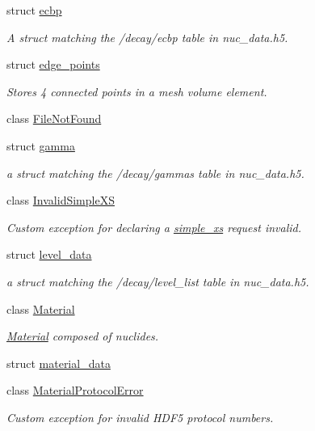 \begin{DoxyCompactItemize}
struct \hyperlink{structpyne_1_1ecbp}{ecbp}
\begin{DoxyCompactList}\small\item\em A struct matching the \textquotesingle{}/decay/ecbp\textquotesingle{} table in nuc\+\_\+data.\+h5. \end{DoxyCompactList}\item 
struct \hyperlink{structpyne_1_1edge__points}{edge\+\_\+points}
\begin{DoxyCompactList}\small\item\em Stores 4 connected points in a mesh volume element. \end{DoxyCompactList}\item 
class \hyperlink{classpyne_1_1_file_not_found}{File\+Not\+Found}
\item 
struct \hyperlink{structpyne_1_1gamma}{gamma}
\begin{DoxyCompactList}\small\item\em a struct matching the \textquotesingle{}/decay/gammas\textquotesingle{} table in nuc\+\_\+data.\+h5. \end{DoxyCompactList}\item 
class \hyperlink{classpyne_1_1_invalid_simple_x_s}{Invalid\+Simple\+XS}
\begin{DoxyCompactList}\small\item\em Custom exception for declaring a \hyperlink{structsimple__xs}{simple\+\_\+xs} request invalid. \end{DoxyCompactList}\item 
struct \hyperlink{structpyne_1_1level__data}{level\+\_\+data}
\begin{DoxyCompactList}\small\item\em a struct matching the \textquotesingle{}/decay/level\+\_\+list\textquotesingle{} table in nuc\+\_\+data.\+h5. \end{DoxyCompactList}\item 
class \hyperlink{classpyne_1_1_material}{Material}
\begin{DoxyCompactList}\small\item\em \hyperlink{classpyne_1_1_material}{Material} composed of nuclides. \end{DoxyCompactList}\item 
struct \hyperlink{structpyne_1_1material__data}{material\+\_\+data}
\item 
class \hyperlink{classpyne_1_1_material_protocol_error}{Material\+Protocol\+Error}
\begin{DoxyCompactList}\small\item\em Custom exception for invalid H\+D\+F5 protocol numbers. \end{DoxyCompactList}\item 

\end{DoxyCompactItemize}
